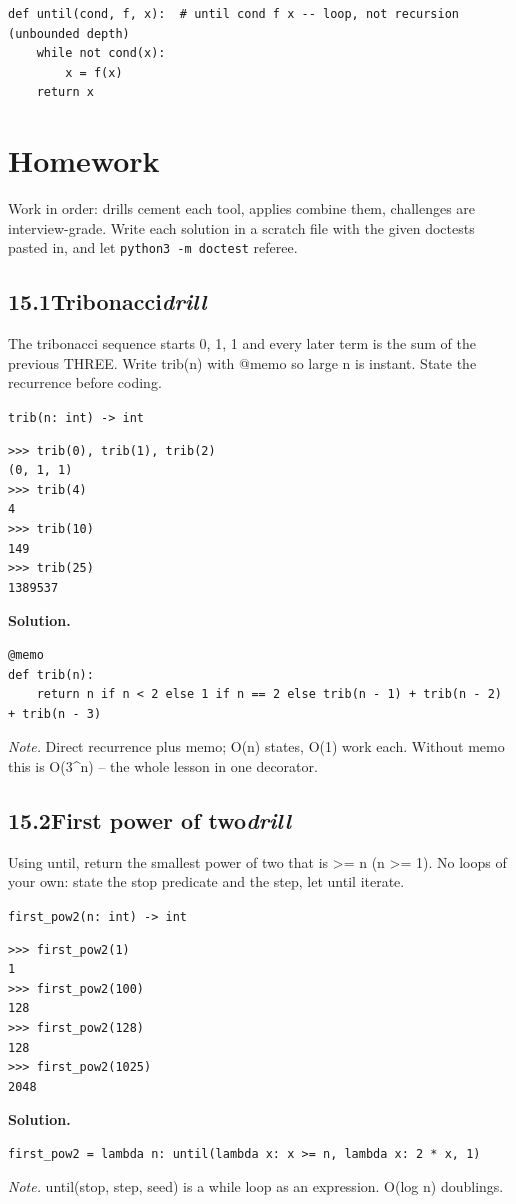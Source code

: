 \documentclass[10pt,letterpaper]{book}
\begin{document}
\begin{lstlisting}[style=ex]
def until(cond, f, x):  # until cond f x -- loop, not recursion (unbounded depth)
    while not cond(x):
        x = f(x)
    return x
\end{lstlisting}
\section{Homework}
Work in order: drills cement each tool, applies combine them,
challenges are interview-grade. Write each solution in a scratch file with
the given doctests pasted in, and let \texttt{python3 -m doctest} referee.
\subsection*{15.1\quad Tribonacci\hfill\textnormal{\textit{drill}}}
The tribonacci sequence starts 0, 1, 1 and every later term is the sum of the previous THREE. Write trib(n) with @memo so large n is instant. State the recurrence before coding.

\noindent\texttt{trib(n: int) -> int}
\begin{lstlisting}[style=ex]
>>> trib(0), trib(1), trib(2)
(0, 1, 1)
>>> trib(4)
4
>>> trib(10)
149
>>> trib(25)
1389537
\end{lstlisting}
\noindent\textbf{Solution.}
\begin{lstlisting}[style=code]
@memo
def trib(n):
    return n if n < 2 else 1 if n == 2 else trib(n - 1) + trib(n - 2) + trib(n - 3)
\end{lstlisting}
\noindent\textit{Note.} Direct recurrence plus memo; O(n) states, O(1) work each. Without memo this is O(3\^{}n) -- the whole lesson in one decorator.

\subsection*{15.2\quad First power of two\hfill\textnormal{\textit{drill}}}
Using until, return the smallest power of two that is >= n (n >= 1). No loops of your own: state the stop predicate and the step, let until iterate.

\noindent\texttt{first\_pow2(n: int) -> int}
\begin{lstlisting}[style=ex]
>>> first_pow2(1)
1
>>> first_pow2(100)
128
>>> first_pow2(128)
128
>>> first_pow2(1025)
2048
\end{lstlisting}
\noindent\textbf{Solution.}
\begin{lstlisting}[style=code]
first_pow2 = lambda n: until(lambda x: x >= n, lambda x: 2 * x, 1)
\end{lstlisting}
\noindent\textit{Note.} until(stop, step, seed) is a while loop as an expression. O(log n) doublings.
\end{document}
